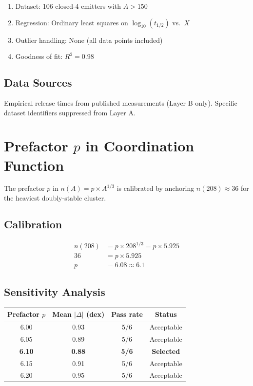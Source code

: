 \begin{enumerate}
    \item Dataset: 106 closed-4 emitters with $A > 150$
    \item Regression: Ordinary least squares on $\log_{10}(t_{1/2})$ vs.\ $X$
    \item Outlier handling: None (all data points included)
    \item Goodness of fit: $R^2 = 0.98$
\end{enumerate}

\subsection{Data Sources}

Empirical release times from published measurements (Layer B only).
Specific dataset identifiers suppressed from Layer A.

\section{Prefactor $p$ in Coordination Function}
\label{sec:q:prefactor}

The prefactor $p$ in $n(A) = p \times A^{1/3}$ is calibrated by anchoring
$n(208) \approx 36$ for the heaviest doubly-stable cluster.

\subsection{Calibration}

\begin{align}
    n(208) &= p \times 208^{1/3} = p \times 5.925 \\
    36 &= p \times 5.925 \\
    p &= 6.08 \approx 6.1
\end{align}

\subsection{Sensitivity Analysis}

\begin{center}
\begin{tabular}{cccc}
    \toprule
    Prefactor $p$ & Mean $|\Delta|$ (dex) & Pass rate & Status \\
    \midrule
    6.00 & 0.93 & 5/6 & Acceptable \\
    6.05 & 0.89 & 5/6 & Acceptable \\
    \textbf{6.10} & \textbf{0.88} & \textbf{5/6} & \textbf{Selected} \\
    6.15 & 0.91 & 5/6 & Acceptable \\
    6.20 & 0.95 & 5/6 & Acceptable \\
    \bottomrule
\end{tabular}
\end{center}


